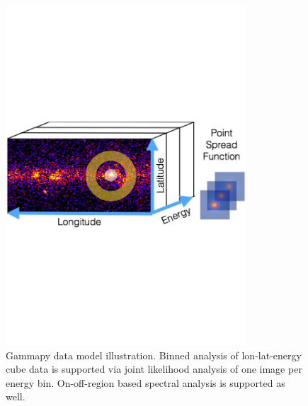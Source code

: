 \begin{figure}[t]
\centering
\includegraphics[width=0.8\textwidth]{figures/gammapy-cube-analysis}
\caption{
Gammapy data model illustration. Binned analysis of lon-lat-energy cube data is
supported via joint likelihood analysis of one image per energy bin.
On-off-region based spectral analysis is supported as well.
}
\label{fig:data-model}
\end{figure}


